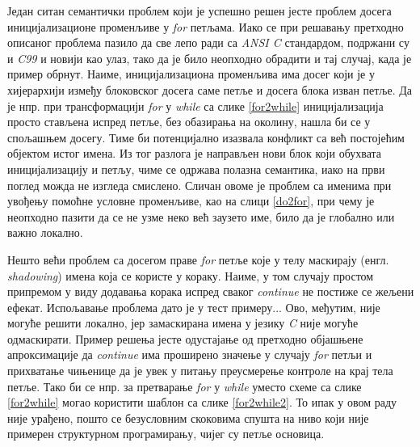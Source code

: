 \documentclass[a4paper]{article}
\begin{document}
Један ситан семантички проблем који је успешно решен јесте проблем досега иницијализационе променљиве у \textit{for} петљама. Иако се при решавању претходно описаног проблема пазило да све лепо ради са \textit{ANSI C} стандардом, подржани су и \textit{C99} и новији као улаз, тако да је било неопходно обрадити и тај случај, када је пример обрнут. Наиме, иницијализациона променљива има досег који је у хијерархији између блоковског досега саме петље и досега блока изван петље. Да је нпр. при трансформацији \textit{for} у \textit{while} са слике \ref{for2while} иницијализација просто стављена испред петље, без обазирања на околину, нашла би се у спољашњем досегу. Тиме би потенцијално изазвала конфликт са већ постојећим објектом истог имена. Из тог разлога је направљен нови блок који обухвата иницијализацију и петљу, чиме се одржава полазна семантика, иако на први поглед можда не изгледа смислено. Сличан овоме је проблем са именима при увођењу помоћне условне променљиве, као на слици \ref{do2for}, при чему је неопходно пазити да се не узме неко већ заузето име, било да је глобално или важно локално.

Нешто већи проблем са досегом праве \textit{for} петље које у телу маскирају (енгл. \textit{shadowing}) имена која се користе у кораку. Наиме, у том случају простом припремом у виду додавања корака испред сваког \textit{continue} не постиже се жељени ефекат. Испољавање проблема дато је у тест примеру... Ово, међутим, није могуће решити локално, јер замаскирана имена у језику \textit{C} није могуће одмаскирати. Пример решења јесте одустајање од претходно објашњене апроксимације да \textit{continue} има проширено значење у случају \textit{for} петљи и прихватање чињенице да је увек у питању преусмерење контроле на крај тела петље. Тако би се нпр. за претварање \textit{for} у \textit{while} уместо схеме са слике \ref{for2while} могао користити шаблон са слике \ref{for2while2}. То ипак у овом раду није урађено, пошто се безусловним скоковима спушта на ниво који није примерен структурном програмирању, чијег су петље основица.
\end{document}
